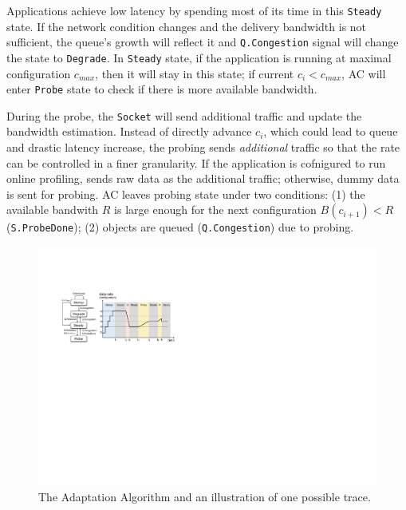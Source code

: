  Applications achieve low latency
by spending most of its time in this \texttt{Steady} state. If the network
condition changes and the delivery bandwidth is not sufficient, the queue's
growth will reflect it and \texttt{Q.Congestion} signal will change the state to
\texttt{Degrade}. In \texttt{Steady} state, if the application is running at
maximal configuration $c_{max}$, then it will stay in this state; if current
$c_i < c_{max}$, AC will enter \texttt{Probe} state to check if there is more
available bandwidth.

 During the probe, the
\texttt{Socket} will send additional traffic and update the bandwidth
estimation. Instead of directly advance $c_i$, which could lead to queue and
drastic latency increase, the probing sends \textit{additional} traffic so that
the rate can be controlled in a finer granularity. If the application is
cofnigured to run online profiling, \sysname{} sends raw data as the additional
traffic; otherwise, dummy data is sent for probing. AC leaves probing state
under two conditions: (1) the available bandwith $R$ is large enough for the
next configuration $B(c_{i+1}) < R$ (\texttt{S.ProbeDone}); (2) objects are
queued (\texttt{Q.Congestion}) due to probing.

\begin{figure}
  \centering
  \includegraphics[width=\columnwidth]{figures/cc.pdf}
  \caption{The Adaptation Algorithm and an illustration of one possible trace.}
  \label{fig:cc}
  \vspace{-2em}
\end{figure}

